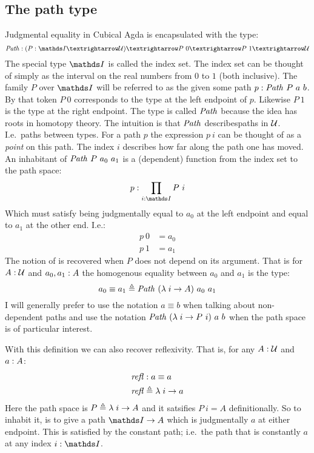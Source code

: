 \subsection{The path type}
Judgmental equality in Cubical Agda is encapsulated with the type:
%
\begin{equation}
\Path \tp (P \tp \I → \MCU) → P\ 0 → P\ 1 → \MCU
\end{equation}
%
The special type $\I$ is called the index set. The index set can be
thought of simply as the interval on the real numbers from $0$ to $1$
(both inclusive). The family $P$ over $\I$ will be referred to as the
 given some path $p \tp \Path\ P\ a\ b$. By
that token $P\ 0$ corresponds to the type at the left endpoint of $p$.
Likewise $P\ 1$ is the type at the right endpoint. The type is called
$\Path$ because the idea has roots in homotopy theory. The intuition
is that $\Path$ describes\linebreak[1] paths in $\mathcal{U}$. I.e.\ paths
between types. For a path $p$ the expression $p\ i$ can be thought of
as a \emph{point} on this path. The index $i$ describes how far along
the path one has moved. An inhabitant of $\Path\ P\ a_0\ a_1$ is a
(dependent) function from the index set to the path space:
%
$$
p \tp \prod_{i \tp \I} P\ i
$$
%
Which must satisfy being judgmentally equal to $a_0$ at the
left endpoint and equal to $a_1$ at the other end. I.e.:
%
\begin{align*}
  p\ 0 & = a_0 \\
  p\ 1 & = a_1
\end{align*}
%
The notion of  is recovered when $P$ does not
depend on its argument. That is for $A \mathrel{:} \mathcal{U}$ and $a_0, a_1 \mathrel{:} A$ the
homogenous equality between $a_0$ and $a_1$ is the type:
%
$$
a_0 \equiv a_1 \defeq \Path\ (\lambda\;i \to A)\ a_0\ a_1
$$
%
I will generally prefer to use the notation $a \equiv b$ when talking
about non-dependent paths and use the notation $\Path\ (\lambda\; i
\to P\ i)\ a\ b$ when the path space is of particular interest.

With this definition we can also recover reflexivity. That is, for any $A \mathrel{:}
\mathcal{U}$ and $a \mathrel{:} A$:
%
\begin{equation}
\begin{aligned}
\refl & \tp a \equiv a \\
\refl & \defeq \lambda\; i \to a
\end{aligned}
\end{equation}
%
Here the path space is $P \mathrel{\triangleq} \lambda\; i \to A$ and it satsifies
$P\ i = A$ definitionally. So to inhabit it, is to give a path $\I \to
A$ which is judgmentally $a$ at either endpoint. This is satisfied by
the constant path; i.e.\ the path that is constantly $a$ at any index
$i \tp \I$.

